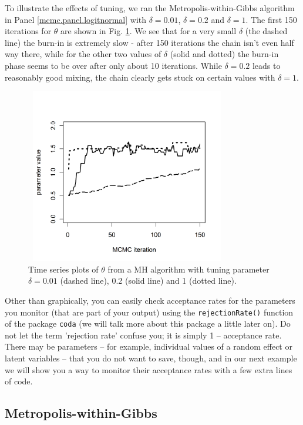 To illustrate the effects of tuning, we ran the
Metropolis-within-Gibbs algorithm in Panel \ref{mcmc.panel.logitnormal} with $\delta=0.01$,
$\delta=0.2$ and $\delta=1$. The first 150 iterations for $\theta$ are
shown in Fig. \ref{mcmc.fig.tuning}. We see that for a very small
$\delta$ (the dashed line) the burn-in is extremely slow - after 150
iterations the chain isn't even half way there, while for the other
two values of $\delta$ (solid and dotted) the burn-in phase seems to be
over after only about 10 iterations. While $\delta=0.2$ leads to
reasonably good mixing, the chain clearly gets stuck on certain values
with $\delta=1$.
 \begin{figure}[ht]
\begin{center}
\includegraphics[height=3in,width=3.5in]{Ch17-MCMC/figs/tuning}
\end{center}
\caption{Time series plots of $\theta$ from a MH algorithm with tuning parameter  $\delta = 0.01$ (dashed line), 0.2 (solid line) and  1 (dotted line).}
\label{mcmc.fig.tuning}
\end{figure}

Other than graphically, you can easily check acceptance rates for the
parameters you monitor (that are part of your output) using the
\verb#rejectionRate()# function of the package {\tt coda} (we will talk more
about this package a little later on). Do not let the term 'rejection
rate' confuse you; it is simply 1 -- acceptance rate. There may be
parameters -- for example, individual values of a random effect or
latent variables -- that you do not want to save, though, and in our
next example we will show you a way to monitor their acceptance rates
with a few extra lines of code.



\subsection{ Metropolis-within-Gibbs }

